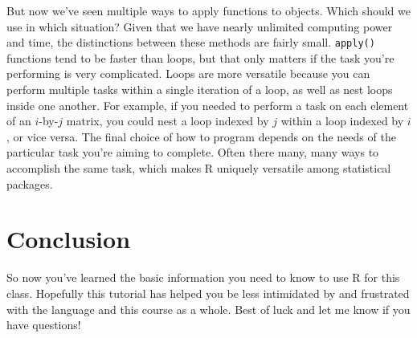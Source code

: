 \documentclass[12pt]{article}\usepackage[]{graphicx}\usepackage[]{color}
\begin{document}
But now we've seen multiple ways to apply functions to objects. Which should we use in which situation? Given that we have nearly unlimited computing power and time, the distinctions between these methods are fairly small. \texttt{apply()} functions tend to be faster than loops, but that only matters if the task you're performing is very complicated. Loops are more versatile because you can perform multiple tasks within a single iteration of a loop, as well as nest loops inside one another. For example, if you needed to perform a task on each element of an $i$-by-$j$ matrix, you could nest a loop indexed by $j$ within a loop indexed by $i$, or vice versa. The final choice of how to program depends on the needs of the particular task you're aiming to complete. Often there many, many ways to accomplish the same task, which makes R uniquely versatile among statistical packages.

\section{Conclusion}\label{sec:conclusion}
So now you've learned the basic information you need to know to use R for this class. Hopefully this tutorial has helped you be less intimidated by and frustrated with the language and this course as a whole. Best of luck and let me know if you have questions!
\end{document}
